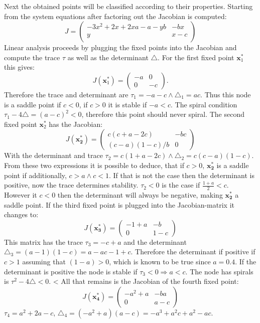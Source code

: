 Next the obtained points will be classified according to their properties. Starting from the system equations after factoring out the Jacobian is computed:
\begin{equation}
J = \begin{pmatrix}
-3x^2 + 2x + 2xa - a - yb & - bx \\
y & x-c \\
\end{pmatrix}
\end{equation}
Linear analysis proceeds by plugging the fixed points into the Jacobian and compute the trace $\tau$ as well as the determinant $\triangle$. For the first fixed point $\mathbf{x}_1^*$ this gives:
\begin{equation}
J(\mathbf{x}_1^*) = \begin{pmatrix}
-a & 0 \\
0  & -c \end{pmatrix}.
\end{equation}
Therefore the trace and determinant are $\tau_1 = -a-c \wedge \triangle_1 = ac$. Thus this node is a saddle point if $c < 0$, if $c > 0$ it is stable if $-a < c$. The spiral condition $\tau_1 - 4\triangle = (a-c)^2 < 0$, therefore this point should never spiral.
The second fixed point $\mathbf{x}_2^*$ has the Jacobian:
\begin{equation}
J(\mathbf{x_2^*}) = \begin{pmatrix}
c(c+a-2c) & - bc \\
(c-a)(1-c)/b &	0
\end{pmatrix}
\end{equation}
With the determinant and trace $\tau_2 = c(1+a-2c) \wedge \triangle_2 = c(c-a)(1-c)$. From these two expressions it is possible to deduce, that if $c>0$, $\mathbf{x_2^*}$ is a saddle point if additionally, $c > a \wedge c < 1$. If that is not the case then the determinant is positive, now the trace determines stability. $\tau_2 < 0$ is the case if $\frac{1+a}{2} < c$. However it $c < 0$ then the determinant will always be negative, making $\mathbf{x_2^*}$ a saddle point.
If the third fixed point is plugged into the Jacobian-matrix it changes to:
\begin{equation}
J(\mathbf{x_3^*}) = \begin{pmatrix}
-1 + a & -b \\
0 & 1-c 
\end{pmatrix}
\end{equation}
This matrix has the trace $\tau_3 = -c + a$ and the determinant $\triangle_3 = (a - 1)(1 - c) = a - ac -1 +c.$ Therefore the determinant if positive if $c > 1$ assuming that $(1-a) > 0$, which is known to be true since $a = 0.4$. If the determinant is positive the node is stable if $\tau_3 < 0 \Rightarrow a < c.$ The node has spirals is $\tau^2 - 4\triangle < 0$.
<
All that remains is the Jacobian of the fourth fixed point:
\begin{equation}
J(\mathbf{x_4^*}) = \begin{pmatrix}
-a ^2 + a & -ba \\
0 & a-c 
\end{pmatrix} 
\end{equation}
$\tau_4 = a^2 + 2a -c$, $\triangle_4 = (-a ^2 + a)(a-c)= -a^3 + a^2c + a^2 - ac$. 

